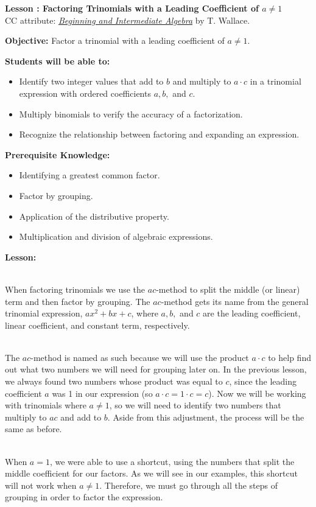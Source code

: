 \documentclass[12pt]{article}
\theoremstyle{definition}
\begin{document}
{\bf \large Lesson : Factoring Trinomials with a Leading Coefficient of $a\neq 1$}
\\ CC attribute: \href{http://www.wallace.ccfaculty.org/book/book.html}{\it{Beginning and Intermediate Algebra}} by T. Wallace. 
\hfill \doclicenseImage[imagewidth=5em]\\
\par
{\bf Objective:} Factor a trinomial with a leading coefficient of $a\neq 1$.\\
\par
{\bf Students will be able to:}
\begin{itemize}
	\item Identify two integer values that add to $b$ and multiply to $a\cdot c$ in a trinomial expression with ordered coefficients $a,b,$ and $c$.
	\item Multiply binomials to verify the accuracy of a factorization.
	\item Recognize the relationship between factoring and expanding an expression.
\end{itemize}
{\bf Prerequisite Knowledge:}
\begin{itemize}
	\item Identifying a greatest common factor.
	\item Factor by grouping.
	\item Application of the distributive property.
	\item Multiplication and division of algebraic expressions.
\end{itemize}
\hrulefill

{\bf Lesson:}\\
\ \par
When factoring trinomials we use the $ac$-method to split the middle (or linear) term and then factor by grouping. The $ac$-method gets its name from the general trinomial expression, $a x^2 + b x + c$, where $a, b,$ and $c$ are the leading coefficient, linear coefficient, and constant term, respectively.\\
\ \par
The $ac$-method is named as such because we will use the product $a \cdot c$ to help find out what two numbers we will need for grouping later on. In the previous lesson, we always found two numbers whose product was equal to $c$, since the leading coefficient $a$ was 1 in our expression (so $a\cdot c=1\cdot c=c$).  Now we will be working with trinomials where $a\neq1$, so we will need to identify two numbers that multiply to $ac$ and add to $b$.  Aside from this adjustment, the process will be the same as before.\\
\ \par
When $a = 1$, we were able to use a shortcut, using the numbers that split the middle coefficient for our factors. As we will see in our examples, this shortcut will not work when $a \neq 1$.  Therefore, we must go through all the steps of grouping in order to factor the expression.
\newpage
\end{document}
